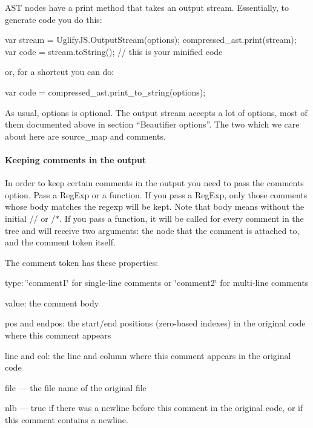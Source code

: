 A\+ST nodes have a {\ttfamily print} method that takes an output stream. Essentially, to generate code you do this\+: 
\begin{DoxyCode}
var stream = UglifyJS.OutputStream(options);
compressed\_ast.print(stream);
var code = stream.toString(); // this is your minified code
\end{DoxyCode}


or, for a shortcut you can do\+: 
\begin{DoxyCode}
var code = compressed\_ast.print\_to\_string(options);
\end{DoxyCode}


As usual, {\ttfamily options} is optional. The output stream accepts a lot of options, most of them documented above in section “\+Beautifier options”. The two which we care about here are {\ttfamily source\+\_\+map} and {\ttfamily comments}.

\paragraph*{Keeping comments in the output}

In order to keep certain comments in the output you need to pass the {\ttfamily comments} option. Pass a Reg\+Exp or a function. If you pass a Reg\+Exp, only those comments whose body matches the regexp will be kept. Note that body means without the initial {\ttfamily //} or {\ttfamily /$\ast$}. If you pass a function, it will be called for every comment in the tree and will receive two arguments\+: the node that the comment is attached to, and the comment token itself.

The comment token has these properties\+:


\begin{DoxyItemize}
\item {\ttfamily type}\+: \char`\"{}comment1\char`\"{} for single-\/line comments or \char`\"{}comment2\char`\"{} for multi-\/line comments
\item {\ttfamily value}\+: the comment body
\item {\ttfamily pos} and {\ttfamily endpos}\+: the start/end positions (zero-\/based indexes) in the original code where this comment appears
\item {\ttfamily line} and {\ttfamily col}\+: the line and column where this comment appears in the original code
\item {\ttfamily file} — the file name of the original file
\item {\ttfamily nlb} — true if there was a newline before this comment in the original code, or if this comment contains a newline.
\end{DoxyItemize}

